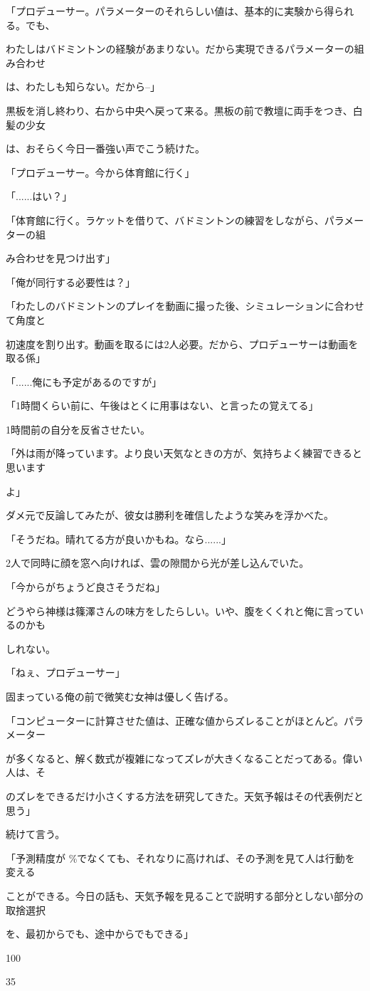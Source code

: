 「プロデューサー。パラメーターのそれらしい値は、基本的に実験から得られる。でも、\par
わたしはバドミントンの経験があまりない。だから実現できるパラメーターの組み合わせ\par
は、わたしも知らない。だから--」\par
黒板を消し終わり、右から中央へ戻って来る。黒板の前で教壇に両⼿をつき、⽩髪の少⼥\par
は、おそらく今⽇⼀番強い声でこう続けた。\par
「プロデューサー。今から体育館に⾏く」\par
「......はい？」\par
「体育館に⾏く。ラケットを借りて、バドミントンの練習をしながら、パラメーターの組\par
み合わせを⾒つけ出す」\par
「俺が同⾏する必要性は？」\par
「わたしのバドミントンのプレイを動画に撮った後、シミュレーションに合わせて⾓度と\par
初速度を割り出す。動画を取るには2⼈必要。だから、プロデューサーは動画を取る係」\par
「......俺にも予定があるのですが」\par
「1時間くらい前に、午後はとくに⽤事はない、と⾔ったの覚えてる」\par
1時間前の⾃分を反省させたい。\par
「外は⾬が降っています。より良い天気なときの⽅が、気持ちよく練習できると思います\par
よ」\par
ダメ元で反論してみたが、彼⼥は勝利を確信したような笑みを浮かべた。\par
「そうだね。晴れてる⽅が良いかもね。なら......」\par
2⼈で同時に顔を窓へ向ければ、雲の隙間から光が差し込んでいた。\par
「今からがちょうど良さそうだね」\par
どうやら神様は篠澤さんの味⽅をしたらしい。いや、腹をくくれと俺に⾔っているのかも\par
しれない。\par
「ねぇ、プロデューサー」\par
固まっている俺の前で微笑む⼥神は優しく告げる。\par
「コンピューターに計算させた値は、正確な値からズレることがほとんど。パラメーター\par
が多くなると、解く数式が複雑になってズレが⼤きくなることだってある。偉い⼈は、そ\par
のズレをできるだけ⼩さくする⽅法を研究してきた。天気予報はその代表例だと思う」\par
続けて⾔う。\par
「予測精度が \%でなくても、それなりに⾼ければ、その予測を⾒て⼈は⾏動を変える\par
ことができる。今⽇の話も、天気予報を⾒ることで説明する部分としない部分の取捨選択\par
を、最初からでも、途中からでもできる」\par
100\par
35\par

